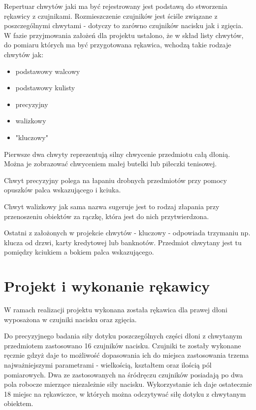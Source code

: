 \documentclass[10pt, a4paper]{article}
\begin{document}
Repertuar chwytów jaki ma być rejestrowany jest podstawą do stworzenia rękawicy z czujnikami. Rozmieszczenie czujników jest ściśle związane z poszczególnymi chwytami - dotyczy to zarówno czujników nacisku jak i zgięcia. W fazie przyjmowania założeń dla projektu ustalono, że w skład listy chwytów, do pomiaru których ma być przygotowana rękawica, wchodzą takie rodzaje chwytów jak:
\begin{itemize}
\item podstawowy walcowy
\item podstawowy kulisty
\item precyzyjny
\item walizkowy
\item "kluczowy"
\end{itemize}

Pierwsze dwa chwyty reprezentują silny chwycenie przedmiotu całą dłonią. Można je zobrazować chwyceniem małej butelki lub piłeczki tenisowej.

Chwyt precyzyjny polega na łapaniu drobnych przedmiotów przy pomocy opuszków palca wskazującego i kciuka.

Chwyt walizkowy jak sama nazwa sugeruje jest to rodzaj złapania przy przenoszeniu obiektów za rączkę, która jest do nich przytwierdzona.

Ostatni z założonych w projekcie chwytów - kluczowy - odpowiada trzymaniu np. klucza od drzwi, karty kredytowej lub banknotów. Przedmiot chwytany jest tu pomiędzy kciukiem a bokiem palca wskazującego.

\section{Projekt i wykonanie rękawicy}
\label{sec:rekawica}
W ramach realizacji projektu wykonana została rękawica dla prawej dłoni wyposażona w czujniki nacisku oraz zgięcia.

Do precyzyjnego badania siły dotyku poszczególnych części dłoni z chwytanym przedmiotem zastosowano 16 czujników nacisku. Czujniki te zostały wykonane ręcznie gdzyż daje to możliwość dopasowania ich do miejsca zastosowania trzema najważniejszymi parametrami - wielkością, kształtem oraz ilością pól pomiarowych. Dwa ze zastosowanych na śródręczu czujników posiadają po dwa pola robocze mierzące niezależnie siły nacisku. Wykorzystanie ich daje ostatecznie 18 miejsc na rękawiczce, w których można odczytywać siłę dotyku z chwytanym obiektem. 
\end{document}
